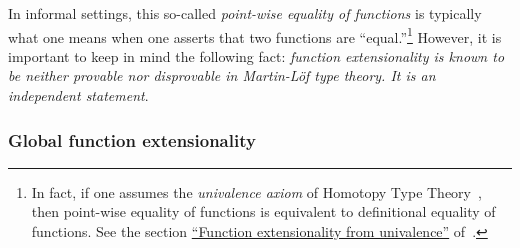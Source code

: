 \ccpad
In informal settings, this so-called \emph{point-wise equality of functions} is typically what one means when one
asserts that two functions are ``equal.''\footnote{In fact, if one assumes the \emph{univalence axiom} of Homotopy Type Theory~\cite{HoTT}, then point-wise equality of functions is equivalent to definitional equality of functions. See the section \href{https://www.cs.bham.ac.uk/~mhe/HoTT-UF-in-Agda-Lecture-Notes/HoTT-UF-Agda.html\#funextfromua}{``Function extensionality from univalence''} of~\cite{MHE}.} However, it is important to keep in mind the following fact: \textit{function extensionality is known to be neither provable nor disprovable in Martin-Löf type theory. It is an independent statement}.~\cite{MHE}

\subsubsection{Global function extensionality}\label{sec:glob-funct-extens}

